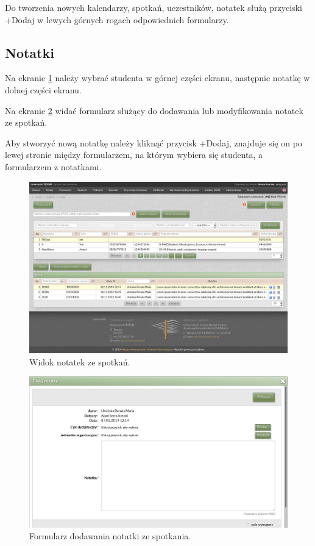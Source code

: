 \documentclass[licencjacka]{pracamgr}
\begin{document}
Do tworzenia nowych kalendarzy, spotkań, uczestników, notatek służą przyciski \textsf{+Dodaj} w lewych górnych rogach odpowiednich formularzy.

\subsection{Notatki}
Na ekranie \ref{fig:notatki} należy wybrać studenta w górnej części ekranu, następnie notatkę w dolnej części ekranu.

Na ekranie \ref{fig:formularz_notatek} widać formularz służący do dodawania lub modyfikowania notatek ze spotkań.

Aby stworzyć nową notatkę należy kliknąć przycisk \textsf{+Dodaj}, znajduje się on po lewej stronie między formularzem, na którym wybiera się studenta, a formularzem z notatkami. 

\begin{figure}[!]
  \includegraphics[width=\linewidth]{widok_notatek.jpg}
  \caption{Widok notatek ze spotkań.}
  \label{fig:notatki}
\end{figure}

\begin{figure}[!]
  \includegraphics[width=\linewidth]{formularz_notatek.jpg}
  \caption{Formularz dodawania notatki ze spotkania.}
  \label{fig:formularz_notatek}
\end{figure}
\end{document}
